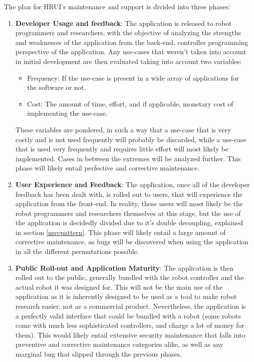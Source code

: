 The plan for HRUI's maintenance and support is divided into three phases:
\begin{enumerate}
	\item \textbf{Developer Usage and feedback}: The application is released to robot programmers and researchers, with the 
	objective of analyzing the strengths and weaknesses of the application from the back-end, controller programming perspective 
	of the application. Any use-cases that weren't taken into account in initial development are then evaluated taking into 
	account two variables:
		\begin{itemize}
			\item Frequency: If the use-case is present in a wide array of applications for the software or not.
			\item Cost: The amount of time, effort, and if applicable, monetary cost of implementing the use-case.
		\end{itemize}
	These variables are pondered, in such a way that a use-case that is very costly and is not used frequently will probably be 
	discarded, while a use-case that is used very frequently and requires little effort will most likely be implemented. Cases 
	in between the extremes will be analyzed further. This phase will likely entail perfective and corrective maintenance.
	\item \textbf{User Experience and Feedback}: The application, once all of the developer feedback has been dealt with, is 
	rolled out to users, that will experience the application from the front-end. In reality, these users will most likely be 
	the robot programmers and researchers themselves at this stage, but the use of the application is decidedly divided due to 
	it's double decoupling, explained in section \ref{mvcpattern}. This phase will likely entail a large amount of corrective 
	maintenance, as bugs will be discovered when using the application in all the different permutations possible.
	\item \textbf{Public Roll-out and Application Maturity}: The application is then rolled out to the public, generally bundled 
	with the robot controller and the actual robot it was designed for. This will not be the main use of the application as it 
	is inherently designed to be used as a tool to make robot research easier, not as a commercial product. Nevertheless, the 
	application is a perfectly valid interface that could be bundled with a robot (some robots come with much less sophisticated 
	controllers, and charge a lot of money for them). This would likely entail extensive security maintenance that falls into 
	preventive and corrective maintenance categories alike, as well as any marginal bug that slipped through the previous phases.
\end{enumerate}
